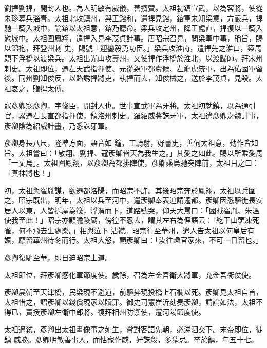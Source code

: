 \begin{pinyinscope}
 劉捍劉捍，開封人也。為人明敏有威儀，善擯贊。太祖初鎮宣武，以為客將，使從朱珍募兵淄青。太祖北攻鎮州，與王鎔和，遣捍見鎔，鎔軍未知梁意，方嚴兵，捍馳一騎入城中，諭鎔以太祖意，鎔乃聽命。梁兵攻定州，降王處直，捍復以一騎入慰城中。太祖圍鳳翔，遣捍入見李茂貞計事。唐昭宗召見，問梁軍中事，稱旨，賜以錦袍，拜登州刺
 史，賜號「迎鑾毅勇功臣。」梁兵攻淮南，遣捍先之淮口，築馬頭下浮橋以渡梁兵。太祖出光山攻壽州，又使捍作浮橋於淮北，以渡歸師。拜宋州刺史。太祖即位，遷左天武指揮使、元從親軍都虞候、左龍虎統軍，出為佑國軍留後。同州劉知俊反，以賂誘捍將吏，執捍而去，知俊械之，送於李茂貞，見殺。太祖哀之，贈捍太傅。



 寇彥卿寇彥卿，字俊臣，開封人也。世事宣武軍為牙將。太祖初就鎮，以為通引官，累遷右長直都指揮使，領洺州刺史。羅紹威將誅牙軍，太祖遣彥卿之魏計事，彥卿陰為紹威計畫，乃悉誅牙軍。



 彥卿身長八尺，隆準方面，語音如
 鐘，工騎射，好書史，善伺太祖意，動作皆如旨。太祖嘗曰：「敬翔、劉捍、寇彥卿皆天為我生之。」其愛之如此。賜以所乘愛馬「一丈烏」。太祖圍鳳翔，以彥卿為都排陣使，彥卿乘烏馳突陣前，太祖目之曰：「真神將也！」



 初，太祖與崔胤謀，欲遷都洛陽，而昭宗不許。其後昭宗奔於鳳翔，太祖以兵圍之，昭宗既出，明年，太祖以兵至河中，遣彥卿奉表迫請遷都。彥卿因悉驅徙長安居人以東，人皆拆屋為筏，浮渭而下，道路號哭，仰天大罵曰：「國賊崔胤、朱溫使我至此！」昭宗亦顧瞻陵廟，傍徨不忍去，謂其左右為俚語云：「紇干山頭凍死雀，何不飛去生處樂。」相與泣下
 沾襟。昭宗行至華州，遣人告太祖以何皇后有娠，願留華州待冬而行。太祖大怒，顧彥卿曰：「汝往趣官家來，不可一日留也。」



 彥卿復馳至華，即日迫昭宗上道。



 太祖即位，拜彥卿感化軍節度使。歲餘，召為左金吾衛大將軍，充金吾衙仗使。



 彥卿晨朝至天津橋，民梁現不避道，前驅捽現投橋上石欄以死。彥卿見太祖自首，太祖惜之，詔彥卿以錢償現家以贖罪。御史司憲崔沂劾奏彥卿，請論如法，太祖不得已，責授彥卿左衛中郎將。復拜相州防禦使，遷河陽節度使。



 太祖遇弒，彥卿出太祖畫像事之如生，嘗對客語先朝，必涕泗交下。末帝即位，徙鎮
 威勝。彥卿明敏善事人，而怙寵作威，好誅殺，多猜忌。卒於鎮，年五十七。



\end{pinyinscope}
